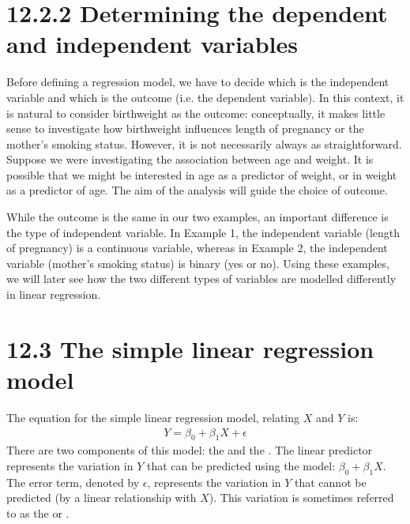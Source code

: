 \documentclass[letterpaper,10pt,english]{jupyterBook}
\begin{document}
\section{12.2.2 Determining the dependent and independent variables}
\label{\detokenize{12.c. Linear Regression I:determining-the-dependent-and-independent-variables}}
\sphinxAtStartPar
Before defining a regression model, we have to decide which is the independent variable and which is the outcome (i.e. the dependent variable). In this context, it is natural to consider birthweight as the outcome: conceptually, it makes little sense to investigate how birthweight influences length of pregnancy or the mother’s smoking status.  However, it is not necessarily always as straightforward. Suppose we were investigating the association between age and weight. It is possible that we might be interested in age as a predictor of weight, or in weight as a predictor of age. The aim of the analysis will guide the choice of outcome.

\sphinxAtStartPar
While the outcome is the same in our two examples, an important difference is the type of independent variable. In Example 1, the independent variable (length of pregnancy) is a continuous variable, whereas in Example 2, the independent variable (mother’s smoking status) is binary (yes or no). Using these examples, we will later see how the two different types of variables are modelled differently in linear regression.


\section{12.3 The simple linear regression model}
\label{\detokenize{12.d. Linear Regression I:the-simple-linear-regression-model}}\label{\detokenize{12.d. Linear Regression I::doc}}
\sphinxAtStartPar
The equation for the simple linear regression model, relating \(X\) and \(Y\) is:
\begin{equation*}
\begin{split}
Y = \beta_0 + \beta_1 X + \epsilon 
\end{split}
\end{equation*}
\sphinxAtStartPar
There are two components of this model: the  and the . The linear predictor represents the variation in \(Y\) that can be predicted using the model: \(\beta_0 + \beta_1 X\). The error term, denoted by \(\epsilon\), represents the variation in \(Y\) that cannot be predicted (by a linear relationship with \(X\)). This variation is sometimes referred to as the  or .
\end{document}
